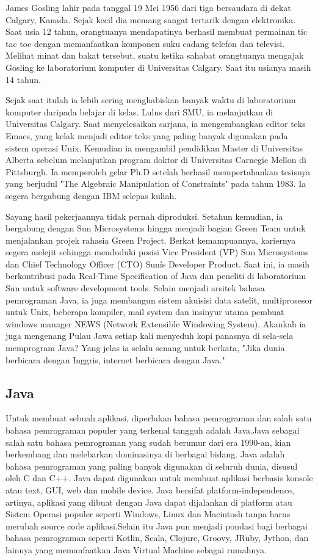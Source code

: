 James Gosling lahir pada tanggal 19 Mei 1956 dari tiga bersaudara di dekat Calgary, Kanada. Sejak kecil dia memang sangat tertarik dengan elektronika. Saat usia 12 tahun, orangtuanya mendapatinya berhasil membuat permainan tic tac toe dengan memanfaatkan komponen suku cadang telefon dan televisi. Melihat minat dan bakat tersebut, suatu ketika sahabat orangtuanya mengajak Gosling ke laboratorium komputer di Universitas Calgary. Saat itu usianya masih 14 tahun.

Sejak saat itulah ia lebih sering menghabiskan banyak waktu di laboratorium komputer daripada belajar di kelas. Lulus dari SMU, ia melanjutkan di Universitas Calgary. Saat menyelesaikan sarjana, ia mengembangkan editor teks Emacs, yang kelak menjadi editor teks yang paling banyak digunakan pada sistem operasi Unix. Kemudian ia mengambil pendidikan Master di Universitas Alberta sebelum melanjutkan program doktor di Universitas Carnegie Mellon di Pittsburgh. Ia memperoleh gelar Ph.D setelah berhasil mempertahankan tesisnya yang berjudul "The Algebraic Manipulation of Constraints" pada tahun 1983. Ia segera bergabung dengan IBM selepas kuliah.

Sayang hasil pekerjaannya tidak pernah diproduksi. Setahun kemudian, ia bergabung dengan Sun Microsystems hingga menjadi bagian Green Team untuk menjalankan projek rahasia Green Project. Berkat kemampuannya, kariernya segera melejit sehingga menduduki posisi Vice President (VP) Sun Microsystems dan Chief Technology Officer (CTO) Sunís Developer Product. Saat ini, ia masih berkontribusi pada Real-Time Specification of Java dan peneliti di laboratorium Sun untuk software development tools. Selain menjadi arsitek bahasa pemrograman Java, ia juga membangun sistem akuisisi data satelit, multiprosesor untuk Unix, beberapa kompiler, mail system dan insinyur utama pembuat windows manager NEWS (Network Extensible Windowing System). Akankah ia juga mengenang Pulau Jawa setiap kali menyeduh kopi panasnya di sela-sela memprogram Java? Yang jelas ia selalu senang untuk berkata, "Jika dunia berbicara dengan Inggris, internet berbicara dengan Java."
\subsection{Java}
Untuk membuat sebuah aplikasi, diperlukan bahasa pemrograman dan salah satu bahasa pemrograman populer yang terkenal tangguh adalah Java.Java sebagai salah satu bahasa pemrograman yang sudah berumur dari era 1990-an, kian berkembang dan melebarkan dominasinya di berbagai bidang. Java adalah bahasa pemrograman yang paling banyak digunakan di seluruh dunia, disusul oleh C dan C++. Java dapat digunakan untuk membuat aplikasi berbasis konsole atau text, GUI, web dan mobile device. Java bersifat platform-independence, artinya, aplikasi yang dibuat dengan Java dapat dijalankan di platform atau Sistem Operasi populer seperti Windows, Linux dan Macintosh tanpa harus merubah source code aplikasi.Selain itu Java pun menjadi pondasi bagi berbagai bahasa pemrograman seperti Kotlin, Scala, Clojure, Groovy, JRuby, Jython, dan lainnya yang memanfaatkan Java Virtual Machine sebagai rumahnya.

